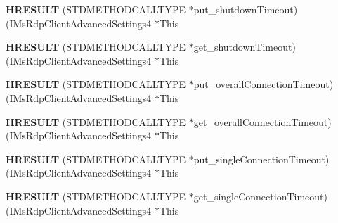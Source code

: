 \begin{DoxyCompactItemize}
\item 
\mbox{\label{struct_i_ms_rdp_client_advanced_settings4_vtbl_ae3d28b75d0776d9c0afe55852380e42c}} 
{\bfseries H\+R\+E\+S\+U\+LT} (S\+T\+D\+M\+E\+T\+H\+O\+D\+C\+A\+L\+L\+T\+Y\+PE $\ast$put\+\_\+shutdown\+Timeout)(I\+Ms\+Rdp\+Client\+Advanced\+Settings4 $\ast$This
\item 
\mbox{\label{struct_i_ms_rdp_client_advanced_settings4_vtbl_a1c4b92a5d56e238656e94f7db2dd317e}} 
{\bfseries H\+R\+E\+S\+U\+LT} (S\+T\+D\+M\+E\+T\+H\+O\+D\+C\+A\+L\+L\+T\+Y\+PE $\ast$get\+\_\+shutdown\+Timeout)(I\+Ms\+Rdp\+Client\+Advanced\+Settings4 $\ast$This
\item 
\mbox{\label{struct_i_ms_rdp_client_advanced_settings4_vtbl_a39a2de81744bcd36a349dc515b3d1c84}} 
{\bfseries H\+R\+E\+S\+U\+LT} (S\+T\+D\+M\+E\+T\+H\+O\+D\+C\+A\+L\+L\+T\+Y\+PE $\ast$put\+\_\+overall\+Connection\+Timeout)(I\+Ms\+Rdp\+Client\+Advanced\+Settings4 $\ast$This
\item 
\mbox{\label{struct_i_ms_rdp_client_advanced_settings4_vtbl_acfad6c2503ce783a26f02be98c99d20f}} 
{\bfseries H\+R\+E\+S\+U\+LT} (S\+T\+D\+M\+E\+T\+H\+O\+D\+C\+A\+L\+L\+T\+Y\+PE $\ast$get\+\_\+overall\+Connection\+Timeout)(I\+Ms\+Rdp\+Client\+Advanced\+Settings4 $\ast$This
\item 
\mbox{\label{struct_i_ms_rdp_client_advanced_settings4_vtbl_adcf340415b70b44eb49782f181e4cfd7}} 
{\bfseries H\+R\+E\+S\+U\+LT} (S\+T\+D\+M\+E\+T\+H\+O\+D\+C\+A\+L\+L\+T\+Y\+PE $\ast$put\+\_\+single\+Connection\+Timeout)(I\+Ms\+Rdp\+Client\+Advanced\+Settings4 $\ast$This
\item 
\mbox{\label{struct_i_ms_rdp_client_advanced_settings4_vtbl_a657e9bee20ff35bd0ac53c00f4cabdb5}} 
{\bfseries H\+R\+E\+S\+U\+LT} (S\+T\+D\+M\+E\+T\+H\+O\+D\+C\+A\+L\+L\+T\+Y\+PE $\ast$get\+\_\+single\+Connection\+Timeout)(I\+Ms\+Rdp\+Client\+Advanced\+Settings4 $\ast$This
\item 
\mbox{\label{struct_i_ms_rdp_client_advanced_settings4_vtbl_a779572c89c3693e720d5a9830284dc70}} 

\end{DoxyCompactItemize}
